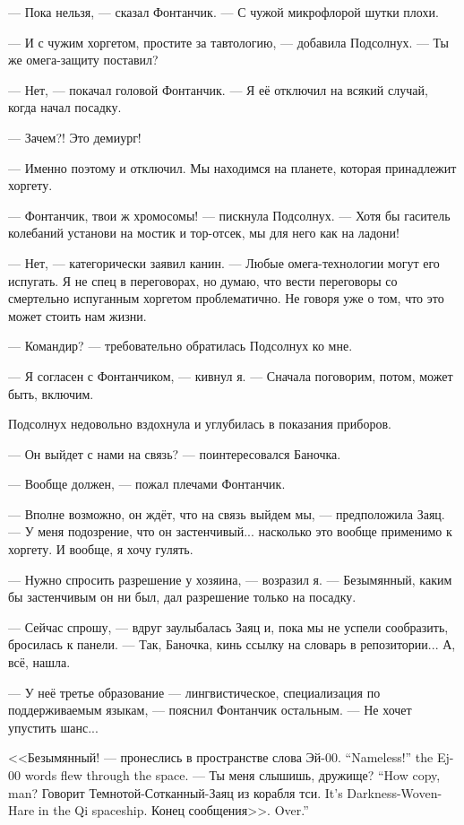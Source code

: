 --- Пока нельзя, --- сказал Фонтанчик.
--- С чужой микрофлорой шутки плохи.

--- И с чужим хоргетом, простите за тавтологию, --- добавила Подсолнух.
--- Ты же омега-защиту поставил?

--- Нет, --- покачал головой Фонтанчик.
--- Я её отключил на всякий случай, когда начал посадку.

--- Зачем?!
Это демиург!

--- Именно поэтому и отключил.
Мы находимся на планете, которая принадлежит хоргету.

--- Фонтанчик, твои ж хромосомы! --- пискнула Подсолнух.
--- Хотя бы гаситель колебаний установи на мостик и тор-отсек, мы для него как на ладони!

--- Нет, --- категорически заявил канин.
--- Любые омега-технологии могут его испугать.
Я не спец в переговорах, но думаю, что вести переговоры со смертельно испуганным хоргетом проблематично.
Не говоря уже о том, что это может стоить нам жизни.

--- Командир? --- требовательно обратилась Подсолнух ко мне.

--- Я согласен с Фонтанчиком, --- кивнул я.
--- Сначала поговорим, потом, может быть, включим.

Подсолнух недовольно вздохнула и углубилась в показания приборов.

--- Он выйдет с нами на связь? --- поинтересовался Баночка.

--- Вообще должен, --- пожал плечами Фонтанчик.

--- Вполне возможно, он ждёт, что на связь выйдем мы, --- предположила Заяц.
--- У меня подозрение, что он застенчивый... насколько это вообще применимо к хоргету.
И вообще, я хочу гулять.

--- Нужно спросить разрешение у хозяина, --- возразил я.
--- Безымянный, каким бы застенчивым он ни был, дал разрешение только на посадку.

--- Сейчас спрошу, --- вдруг заулыбалась Заяц и, пока мы не успели сообразить, бросилась к панели.
--- Так, Баночка, кинь ссылку на словарь в репозитории...
А, всё, нашла.

--- У неё третье образование --- лингвистическое, специализация по поддерживаемым языкам, --- пояснил Фонтанчик остальным.
--- Не хочет упустить шанс...

{<<Безымянный! --- пронеслись в пространстве слова Эй-00.}
{``Nameless!'' the Ej-00 words flew through the space.}
{--- Ты меня слышишь, дружище?}
{``How copy, man?}
{Говорит Темнотой-Сотканный-Заяц из корабля тси.}
{It's Darkness-Woven-Hare in the Qi spaceship.}
{Конец сообщения>>.}
{Over.''}


